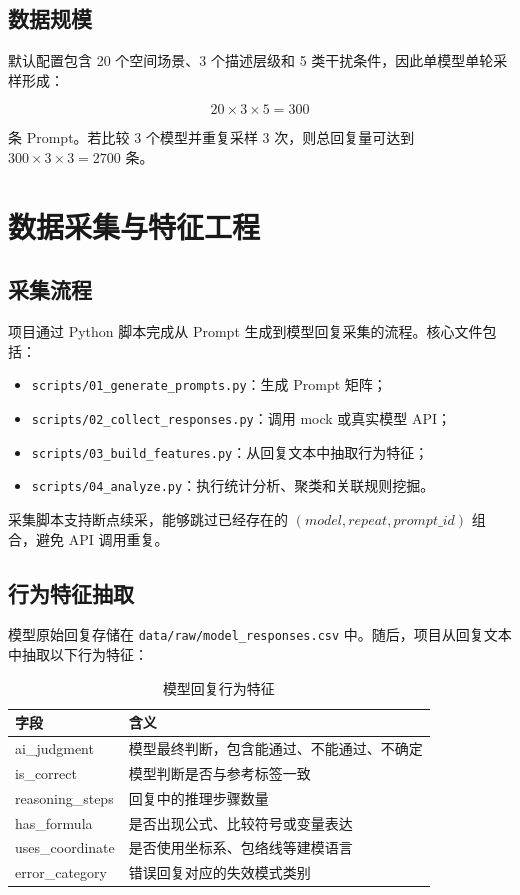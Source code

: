 \documentclass{BJUTReport}
\begin{document}
\subsection{数据规模}

默认配置包含 20 个空间场景、3 个描述层级和 5 类干扰条件，因此单模型单轮采样形成：

\begin{equation}
20 \times 3 \times 5 = 300
\label{eq:prompt-size}
\end{equation}

条 Prompt。若比较 3 个模型并重复采样 3 次，则总回复量可达到 $300 \times 3 \times 3 = 2700$ 条。

\section{数据采集与特征工程}

\subsection{采集流程}

项目通过 Python 脚本完成从 Prompt 生成到模型回复采集的流程。核心文件包括：

\begin{itemize}
    \item \verb|scripts/01_generate_prompts.py|：生成 Prompt 矩阵；
    \item \verb|scripts/02_collect_responses.py|：调用 mock 或真实模型 API；
    \item \verb|scripts/03_build_features.py|：从回复文本中抽取行为特征；
    \item \verb|scripts/04_analyze.py|：执行统计分析、聚类和关联规则挖掘。
\end{itemize}

采集脚本支持断点续采，能够跳过已经存在的 $(model, repeat, prompt\_id)$ 组合，避免 API 调用重复。

\subsection{行为特征抽取}

模型原始回复存储在 \verb|data/raw/model_responses.csv| 中。随后，项目从回复文本中抽取以下行为特征：

\begin{table}[H]
  \centering
  \caption{模型回复行为特征}
  \begin{tabular}{ll}
    \toprule
    \textbf{字段} & \textbf{含义} \\
    \midrule
    ai\_judgment & 模型最终判断，包含能通过、不能通过、不确定 \\
    is\_correct & 模型判断是否与参考标签一致 \\
    reasoning\_steps & 回复中的推理步骤数量 \\
    has\_formula & 是否出现公式、比较符号或变量表达 \\
    uses\_coordinate & 是否使用坐标系、包络线等建模语言 \\
    error\_category & 错误回复对应的失效模式类别 \\
    \bottomrule
  \end{tabular}
  \label{tab:features}
\end{table}
\end{document}
